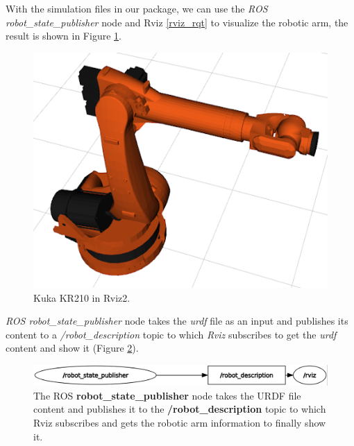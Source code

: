\documentclass[12pt,oneside]{article}
\begin{document}
With the simulation files in our package, we can use the \textit{ROS robot\_state\_publisher} node and Rviz \ref{rviz_rqt} to visualize the robotic arm, the result is shown in Figure \ref{fig:kuka1}.
\begin{figure}[H]
	\centering
	\includegraphics[width=0.7\linewidth]{kuka1}
	\caption[Rviz2 kuka]{Kuka KR210 in Rviz2.}
	\label{fig:kuka1}
\end{figure}

\textit{ROS robot\_state\_publisher} node takes the \textit{urdf} file as an input and publishes its content to a \textit{/robot\_description} topic to which \textit{Rviz} subscribes to get the \textit{urdf} content and show it (Figure \ref{fig:rosgraph1}). 

\begin{figure}[H]
\centering
\includegraphics[width=0.7\linewidth]{rosgraph1}
\caption{The ROS \textbf{robot\_state\_publisher} node takes the URDF file content and publishes it to the \textbf{/robot\_description} topic to which Rviz subscribes and gets the robotic arm information to finally show it.}
\label{fig:rosgraph1}
\end{figure}
\end{document}

